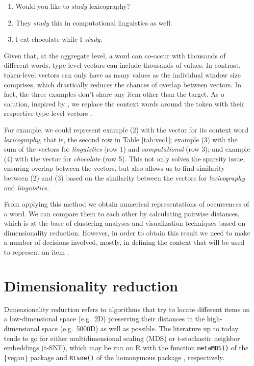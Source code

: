 \documentclass[
]{book}
\providecommand{\tightlist}{%
  \setlength{\itemsep}{0pt}\setlength{\parskip}{0pt}}
\begin{document}
\begin{enumerate}
\def\labelenumi{(\arabic{enumi})}
\setcounter{enumi}{1}
\tightlist
\item
  Would you like to \emph{study} lexicography?
\item
  They \emph{study} this in computational linguistics as well.
\item
  I eat chocolate while I \emph{study}.
\end{enumerate}

Given that, at the aggregate level, a word can co-occur with thousands of different words, type-level vectors can include thousands of values. In contrast, token-level vectors can only have as many values as the individual window size comprises, which drastically reduces the chances of overlap between vectors. In fact, the three examples don't share any item other than the target. As a solution, inspired by \textcite{schutze_1998}, we replace the context words around the token with their respective type-level vectors \autocite{heylen.etal_2015,depascale_2019}.

For example, we could represent example (2) with the vector for its context word \emph{lexicography}, that is, the second row in Table \ref{tab:vec1}; example (3) with the sum of the vectors for \emph{linguistics} (row 1) and \emph{computational} (row 3); and example (4) with the vector for \emph{chocolate} (row 5). This not only solves the sparsity issue, ensuring overlap between the vectors, but also allows us to find similarity between (2) and (3) based on the similarity between the vectors for \emph{lexicography} and \emph{linguistics}.

From applying this method we obtain numerical representations of occurrences of a word. We can compare them to each other by calculating pairwise distances, which is at the base of clustering analyses and visualization techniques based on dimensionality reduction. However, in order to obtain this result we need to make a number of decisions involved, mostly, in defining the context that will be used to represent an item \autocite[Cf.][ 83]{bolognesi_2020}.

\hypertarget{dim-reduction}{%
\section{Dimensionality reduction}\label{dim-reduction}}

Dimensionality reduction refers to algorithms that try to locate different items on a low-dimensional space (e.g.~2D) preserving their distances in the high-dimensional space (e.g.~5000D) as well as possible.
The literature up to today tends to go for either multidimensional scaling (MDS) or t-stochastic neighbor embeddings (t-SNE),
which may be run on R with the function \texttt{metaMDS()} of the \{vegan\} package \autocite{R-vegan}
and \texttt{Rtsne()} of the homonymous package \autocite{R-Rtsne}, respectively.
\end{document}
